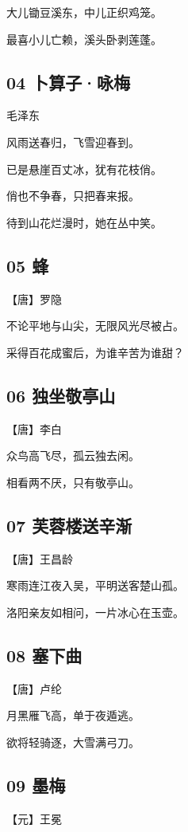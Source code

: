 \documentclass[12pt]{article}
\begin{document}
大儿锄豆溪东，中儿正织鸡笼。

最喜小儿亡赖，溪头卧剥莲蓬。

\subsection*{04 卜算子·咏梅}

毛泽东

风雨送春归，飞雪迎春到。

已是悬崖百丈冰，犹有花枝俏。

俏也不争春，只把春来报。

待到山花烂漫时，她在丛中笑。

\subsection*{05 蜂}

【唐】罗隐

不论平地与山尖，无限风光尽被占。

采得百花成蜜后，为谁辛苦为谁甜？

\subsection*{06 独坐敬亭山}

【唐】李白

众鸟高飞尽，孤云独去闲。

相看两不厌，只有敬亭山。

\subsection*{07 芙蓉楼送辛渐}

【唐】王昌龄

寒雨连江夜入吴，平明送客楚山孤。

洛阳亲友如相问，一片冰心在玉壶。

\subsection*{08 塞下曲}

【唐】卢纶

月黑雁飞高，单于夜遁逃。

欲将轻骑逐，大雪满弓刀。

\subsection*{09 墨梅}

【元】王冕
\end{document}
